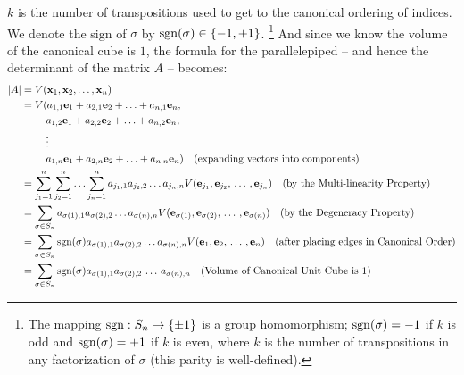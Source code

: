 \documentclass{article}
\begin{document}
$k$ is the number of transpositions used to get to the canonical ordering of
indices. We denote the sign of $\sigma$ by ${\rm sgn}(\sigma) \in \{-1, +1\}$.%
\footnote{The mapping ${\rm sgn}: S_n \rightarrow \{\pm 1\}$ is a group homomorphism;
${\rm sgn}(\sigma) = -1$ if $k$ is odd and ${\rm sgn}(\sigma) = +1$ if $k$ is even,
where $k$ is the number of transpositions in any factorization of $\sigma$ (this
parity is well-defined).}
And since we know the volume of the canonical cube is $1$,
the formula for the parallelepiped -- and hence the
determinant of the matrix $A$ -- becomes:
\begin{align}
  |A| &= V({\bf x}_1, {\bf x}_2, \ldots, {\bf x}_n) \nonumber \\
  &= V(a_{1, 1} {\bf e}_1 + a_{2, 1} {\bf e}_2 + \ldots + a_{n,1}{\bf e}_n, \nonumber \\
      &\phantom{= V(\,}a_{1, 2} {\bf e}_1 + a_{2, 2} {\bf e}_2
                       + \ldots + a_{n,2}{\bf e}_n, \nonumber \\
      &\phantom{= V(\,} \vdots \nonumber \\
      &\phantom{= V(\,} a_{1, n} {\bf e}_1 + a_{2, n} {\bf e}_2
                       + \ldots + a_{n,n}{\bf e}_n)
                       \nonumber \quad
                       \text{(expanding vectors into components)} \nonumber \\
      &= \sum_{j_1=1}^n \sum_{j_2=1}^n \ldots \sum_{j_n=1}^n 
            a_{j_1,1} a_{j_2, 2} \ldots a_{j_n, n}
            V({\bf e}_{j_1}, {\bf e}_{j_2}, \, \ldots \, , {\bf e}_{j_n}) 
            \quad \text{(by the Multi-linearity Property)} \nonumber \\
  &= \sum_{\sigma \in S_n} a_{\sigma(1), 1} a_{\sigma(2),2} \ldots a_{\sigma(n), n}
        V({\bf e}_{\sigma(1)}, {\bf e}_{\sigma(2)}, \, \ldots \, , {\bf e}_{\sigma(n)})
        \quad \text{(by the Degeneracy Property)} \nonumber \\
      &= \sum_{\sigma \in S_n} {\rm sgn}(\sigma)
            a_{\sigma(1), 1} a_{\sigma(2),2} \ldots a_{\sigma(n), n}
        V({\bf e}_{1}, {\bf e}_{2}, \, \ldots \, , {\bf e}_{n})
        \quad \text{(after placing edges in Canonical Order)}\nonumber \\
      &= \sum_{\sigma \in S_n} {\rm sgn}(\sigma)
            a_{\sigma(1), 1} a_{\sigma(2),2} \, \ldots \, a_{\sigma(n), n} \quad
        \text{(Volume of Canonical Unit Cube is $1$)}
\end{align}
\end{document}
